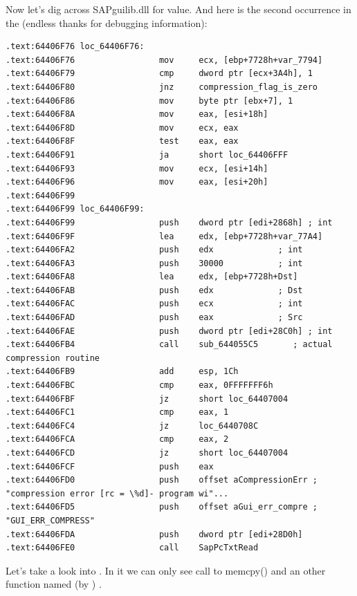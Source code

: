 {Now let's dig across SAPguilib.dll for  value. And here is the second occurrence in 
the  (endless thanks for debugging information):}

\begin{lstlisting}
.text:64406F76 loc_64406F76:
.text:64406F76                 mov     ecx, [ebp+7728h+var_7794]
.text:64406F79                 cmp     dword ptr [ecx+3A4h], 1
.text:64406F80                 jnz     compression_flag_is_zero
.text:64406F86                 mov     byte ptr [ebx+7], 1
.text:64406F8A                 mov     eax, [esi+18h]
.text:64406F8D                 mov     ecx, eax
.text:64406F8F                 test    eax, eax
.text:64406F91                 ja      short loc_64406FFF
.text:64406F93                 mov     ecx, [esi+14h]
.text:64406F96                 mov     eax, [esi+20h]
.text:64406F99
.text:64406F99 loc_64406F99:
.text:64406F99                 push    dword ptr [edi+2868h] ; int
.text:64406F9F                 lea     edx, [ebp+7728h+var_77A4]
.text:64406FA2                 push    edx             ; int
.text:64406FA3                 push    30000           ; int
.text:64406FA8                 lea     edx, [ebp+7728h+Dst]
.text:64406FAB                 push    edx             ; Dst
.text:64406FAC                 push    ecx             ; int
.text:64406FAD                 push    eax             ; Src
.text:64406FAE                 push    dword ptr [edi+28C0h] ; int
.text:64406FB4                 call    sub_644055C5       ; actual compression routine
.text:64406FB9                 add     esp, 1Ch
.text:64406FBC                 cmp     eax, 0FFFFFFF6h
.text:64406FBF                 jz      short loc_64407004
.text:64406FC1                 cmp     eax, 1
.text:64406FC4                 jz      loc_6440708C
.text:64406FCA                 cmp     eax, 2
.text:64406FCD                 jz      short loc_64407004
.text:64406FCF                 push    eax
.text:64406FD0                 push    offset aCompressionErr ; "compression error [rc = \%d]- program wi"...
.text:64406FD5                 push    offset aGui_err_compre ; "GUI_ERR_COMPRESS"
.text:64406FDA                 push    dword ptr [edi+28D0h]
.text:64406FE0                 call    SapPcTxtRead
\end{lstlisting}

{Let's take a look into . In it we can only see call to memcpy() and an other function named 
(by \IDA) .}

